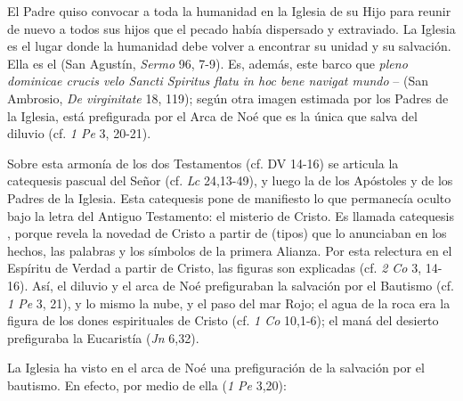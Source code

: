 

\begin{ccebody}
 El Padre quiso convocar a toda la humanidad en la Iglesia de su Hijo para reunir de nuevo a todos sus hijos que el pecado había dispersado y extraviado. La Iglesia es el lugar donde la humanidad debe volver a encontrar su unidad y su salvación. Ella es el  (San Agustín, \textit{Sermo} 96, 7-9). Es, además, este barco que \textit{pleno dominicae crucis velo Sancti Spiritus flatu in hoc bene navigat mundo} –  (San Ambrosio, \textit{De virginitate} 18, 119); según otra imagen estimada por los Padres de la Iglesia, está prefigurada por el Arca de Noé que es la única que salva del diluvio (cf. \textit{1 Pe} 3, 20-21).

 Sobre esta armonía de los dos Testamentos (cf. DV 14-16) se articula la catequesis pascual del Señor (cf. \textit{Lc} 24,13-49), y luego la de los Apóstoles y de los Padres de la Iglesia. Esta catequesis pone de manifiesto lo que permanecía oculto bajo la letra del Antiguo Testamento: el misterio de Cristo. Es llamada catequesis , porque revela la novedad de Cristo a partir de  (tipos) que lo anunciaban en los hechos, las palabras y los símbolos de la primera Alianza. Por esta relectura en el Espíritu de Verdad a partir de Cristo, las figuras son explicadas (cf. \textit{2 Co} 3, 14-16). Así, el diluvio y el arca de Noé prefiguraban la salvación por el Bautismo (cf. \textit{1 Pe} 3, 21), y lo mismo la nube, y el paso del mar Rojo; el agua de la roca era la figura de los dones espirituales de Cristo (cf. \textit{1 Co} 10,1-6); el maná del desierto prefiguraba la Eucaristía  (\textit{Jn} 6,32).

 La Iglesia ha visto en el arca de Noé una prefiguración de la salvación por el bautismo. En efecto, por medio de ella  (\textit{1 Pe} 3,20):

\end{ccebody}


